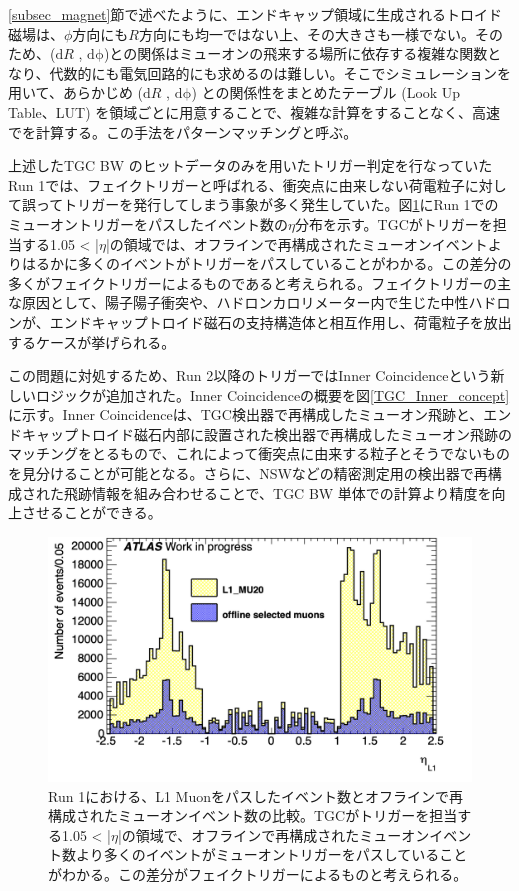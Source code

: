 \ref{subsec_magnet}節で述べたように、エンドキャップ領域に生成されるトロイド磁場は、$\phi$方向にも$R$方向にも均一ではない上、その大きさも一様でない。そのため、($\mathrm{d}R$ , $\mathrm{d\phi}$)と\pt の関係はミューオンの飛来する場所に依存する複雑な関数となり、代数的にも電気回路的にも求めるのは難しい。そこでシミュレーションを用いて、あらかじめ  ($\mathrm{d}R$ , $\mathrm{d\phi}$) と\pt の関係性をまとめたテーブル  (Look Up Table、LUT) を領域ごとに用意することで、複雑な計算をすることなく、高速で\pt を計算する。この手法をパターンマッチングと呼ぶ。

上述したTGC BW のヒットデータのみを用いたトリガー判定を行なっていたRun 1では、フェイクトリガーと呼ばれる、衝突点に由来しない荷電粒子に対して誤ってトリガーを発行してしまう事象が多く発生していた。図\ref{TGC_faketrigger}にRun 1でのミューオントリガーをパスしたイベント数の$\eta$分布を示す。TGCがトリガーを担当する1.05 < |$\eta$|の領域では、オフラインで再構成されたミューオンイベントよりはるかに多くのイベントがトリガーをパスしていることがわかる。この差分の多くがフェイクトリガーによるものであると考えられる。フェイクトリガーの主な原因として、陽子陽子衝突や、ハドロンカロリメーター内で生じた中性ハドロンが、エンドキャップトロイド磁石の支持構造体と相互作用し、荷電粒子を放出するケースが挙げられる。

この問題に対処するため、Run 2以降のトリガーではInner Coincidenceという新しいロジックが追加された。Inner Coincidenceの概要を図\ref{TGC_Inner_concept}に示す。Inner Coincidenceは、TGC検出器で再構成したミューオン飛跡と、エンドキャップトロイド磁石内部に設置された検出器で再構成したミューオン飛跡のマッチングをとるもので、これによって衝突点に由来する粒子とそうでないものを見分けることが可能となる。さらに、NSWなどの精密測定用の検出器で再構成された飛跡情報を組み合わせることで、TGC BW 単体での\pt 計算より精度を向上させることができる。


\begin{figure} 
\centering
\includegraphics[width=16cm]{fig/Intro/TGC_faketrigger.png}
\caption[L1 Muonをパスしたイベント数とオフラインで再構成されたミューオンイベント数の比較]{Run 1における、L1 Muonをパスしたイベント数とオフラインで再構成されたミューオンイベント数の比較。TGCがトリガーを担当する1.05 < |$\eta$|の領域で、オフラインで再構成されたミューオンイベント数より多くのイベントがミューオントリガーをパスしていることがわかる。この差分がフェイクトリガーによるものと考えられる。}
\label{TGC_faketrigger}
\end{figure}


